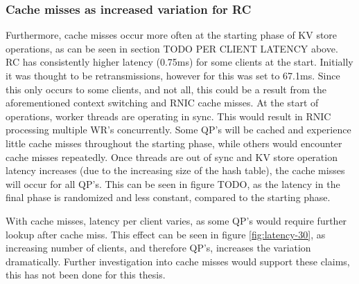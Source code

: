 \subsubsection{Cache misses as increased variation for RC}
Furthermore, cache misses occur more often at the starting phase of KV store operations, as can be seen in section TODO PER CLIENT LATENCY above.
RC has consistently higher latency (0.75ms) for some clients at the start.
Initially it was thought to be retransmissions, however for this was set to 67.1ms.
Since this only occurs to some clients, and not all, this could be a result from the aforementioned context switching and RNIC cache misses.
At the start of operations, worker threads are operating in sync.
This would result in RNIC processing multiple WR's concurrently.
Some QP's will be cached and experience little cache misses throughout the starting phase, while others would encounter cache misses repeatedly.
Once threads are out of sync and KV store operation latency increases (due to the increasing size of the hash table), the cache misses will occur for all QP's.
This can be seen in figure TODO, as the latency in the final phase is randomized and less constant, compared to the starting phase.

With cache misses, latency per client varies, as some QP's would require further lookup after cache miss.
This effect can be seen in figure \ref{fig:latency-30}, as increasing number of clients, and therefore QP's, increases the variation dramatically.
Further investigation into cache misses would support these claims, this has not been done for this thesis.

